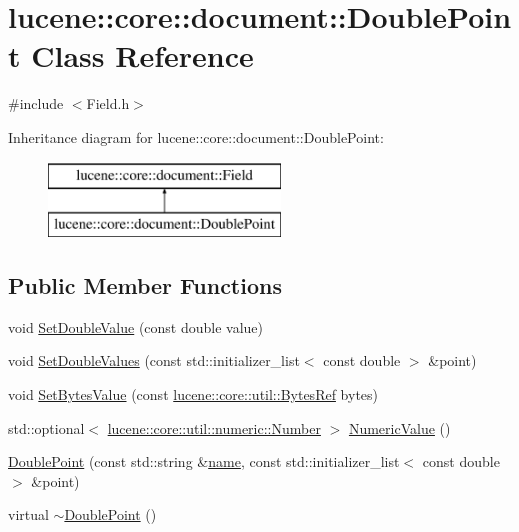 \hypertarget{classlucene_1_1core_1_1document_1_1DoublePoint}{}\section{lucene\+:\+:core\+:\+:document\+:\+:Double\+Point Class Reference}
\label{classlucene_1_1core_1_1document_1_1DoublePoint}


{\ttfamily \#include $<$Field.\+h$>$}

Inheritance diagram for lucene\+:\+:core\+:\+:document\+:\+:Double\+Point\+:\begin{figure}[H]
\begin{center}
\leavevmode
\includegraphics[height=2.000000cm]{classlucene_1_1core_1_1document_1_1DoublePoint}
\end{center}
\end{figure}
\subsection*{Public Member Functions}
\begin{DoxyCompactItemize}
\item 
void \mbox{\hyperlink{classlucene_1_1core_1_1document_1_1DoublePoint_a71a14c1578c356e006c422f2c8a267b8}{Set\+Double\+Value}} (const double value)
\item 
void \mbox{\hyperlink{classlucene_1_1core_1_1document_1_1DoublePoint_afcc80550e3b4ca606c601304782c1998}{Set\+Double\+Values}} (const std\+::initializer\+\_\+list$<$ const double $>$ \&point)
\item 
void \mbox{\hyperlink{classlucene_1_1core_1_1document_1_1DoublePoint_af6162d3a002e5cd557b63afea4efee1e}{Set\+Bytes\+Value}} (const \mbox{\hyperlink{classlucene_1_1core_1_1util_1_1BytesRef}{lucene\+::core\+::util\+::\+Bytes\+Ref}} bytes)
\item 
std\+::optional$<$ \mbox{\hyperlink{classlucene_1_1core_1_1util_1_1numeric_1_1Number}{lucene\+::core\+::util\+::numeric\+::\+Number}} $>$ \mbox{\hyperlink{classlucene_1_1core_1_1document_1_1DoublePoint_aff495d94ea271af89212706b21aa3196}{Numeric\+Value}} ()
\item 
\mbox{\hyperlink{classlucene_1_1core_1_1document_1_1DoublePoint_af18300dfcbaa7b925acef0e6e8a3c103}{Double\+Point}} (const std\+::string \&\mbox{\hyperlink{classlucene_1_1core_1_1document_1_1Field_a52f673f3b3abb14b180f5159f4726537}{name}}, const std\+::initializer\+\_\+list$<$ const double $>$ \&point)
\item 
virtual \mbox{\hyperlink{classlucene_1_1core_1_1document_1_1DoublePoint_a56bcf2eb9f2d4102e9da8f6fa1eddd9d}{$\sim$\+Double\+Point}} ()
\end{DoxyCompactItemize}
